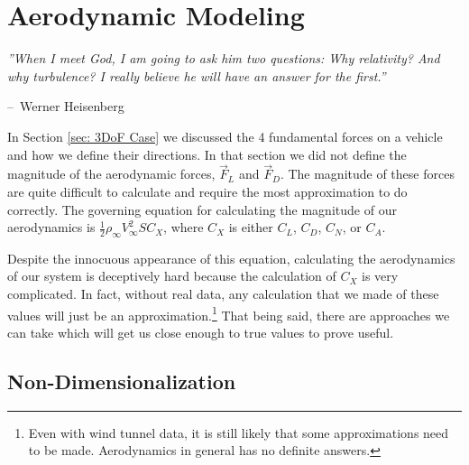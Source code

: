 \documentclass[12pt]{report}
\makeatletter
\newenvironment{chapquote}[2][2em]
  {\setlength{\@tempdima}{#1}%
   \def\chapquote@author{#2}%
   \parshape 1 \@tempdima \dimexpr\textwidth-2\@tempdima\relax%
   \itshape}
  {\par\normalfont\hfill--\ \chapquote@author\hspace*{\@tempdima}\par\bigskip}
\makeatother
\begin{document}
\chapter{Aerodynamic Modeling}\label{sec: aerodynamics}
\begin{chapquote}{Werner Heisenberg}
''When I meet God, I am going to ask him two questions: Why relativity? And why turbulence? I really believe he will have an answer for the first.''
\end{chapquote}
In Section \ref{sec: 3DoF Case} we discussed the 4 fundamental forces on a vehicle and how we define their directions. In that section we did not define the magnitude of the aerodynamic forces, $\vec{F}_L$ and $\vec{F}_D$. The magnitude of these forces are quite difficult to calculate and require the most approximation to do correctly. The governing equation for calculating the magnitude of our aerodynamics is $\frac{1}{2}\rho_{\infty}V^2_{\infty}SC_X$, where $C_X$ is either $C_L$, $C_D$, $C_N$, or $C_A$.

Despite the innocuous appearance of this equation, calculating the aerodynamics of our system is deceptively hard because the calculation of $C_X$ is very complicated. In fact, without real data, any calculation that we made of these values will just be an approximation.\footnote{Even with wind tunnel data, it is still likely that some approximations need to be made. Aerodynamics in general has no definite answers.} That being said, there are approaches we can take which will get us close enough to true values to prove useful.

\section{Non-Dimensionalization}
\end{document}
